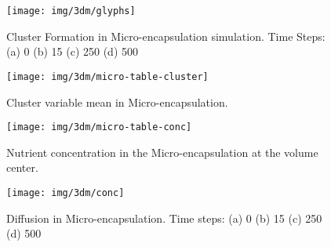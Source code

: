 \begin{figure}[H]
\centering
\setlength\fboxsep{0pt}
\setlength\fboxrule{0.5pt}
\texttt{[image: img/3dm/glyphs]}
\caption{Cluster Formation in Micro-encapsulation simulation. Time Steps: (a) 0 (b) 15 (c) 250 (d) 500}
\label{fig:micro-glyphs}
\end{figure}

\begin{figure}[H]
\centering
\setlength\fboxsep{0pt}
\setlength\fboxrule{0.5pt}
\texttt{[image: img/3dm/micro-table-cluster]}
\caption{Cluster variable mean in Micro-encapsulation.}
\label{fig:micro-table-cluster}
\end{figure}

\begin{figure}[H]
\centering
\setlength\fboxsep{0pt}
\setlength\fboxrule{0.5pt}
\texttt{[image: img/3dm/micro-table-conc]}
\caption{Nutrient concentration in the Micro-encapsulation at the volume center.}
\label{fig:micro-table-conc}
\end{figure}

\begin{figure}[H]
\centering
\setlength\fboxsep{0pt}
\setlength\fboxrule{0.5pt}
\texttt{[image: img/3dm/conc]}
\caption{Diffusion in Micro-encapsulation. Time steps: (a) 0 (b) 15 (c) 250 (d) 500}
\label{fig:micro-conc}
\end{figure}





\newpage   